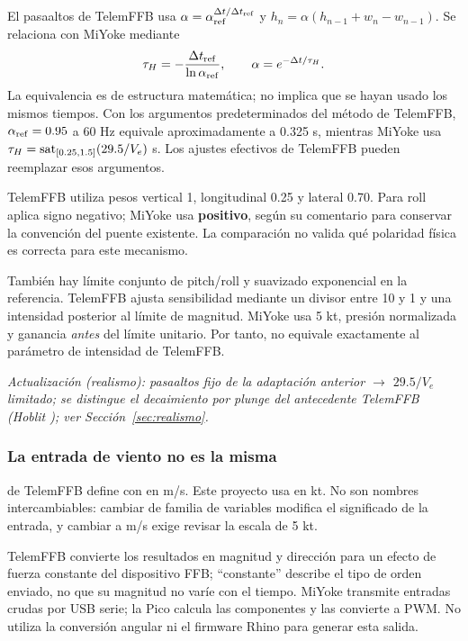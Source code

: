 El pasaaltos de TelemFFB usa $\alpha=\alpha_{\rm ref}^{\Delta t/\Delta t_{\rm ref}}$ y $h_n=\alpha(h_{n-1}+w_n-w_{n-1})$. Se relaciona con MiYoke mediante
\begin{equation}
\tau_H=-\frac{\Delta t_{\rm ref}}{\ln\alpha_{\rm ref}},
\qquad \alpha=e^{-\Delta t/\tau_H}.
\end{equation}
La equivalencia es de estructura matemática; no implica que se hayan usado los mismos tiempos. Con los argumentos predeterminados del método de TelemFFB, $\alpha_{\rm ref}=0.95$ a 60 Hz equivale aproximadamente a 0.325 s, mientras MiYoke usa $\tau_H=\operatorname{sat}_{[0.25,1.5]}(29.5/V_e)$ s. Los ajustes efectivos de TelemFFB pueden reemplazar esos argumentos.

TelemFFB utiliza pesos vertical 1, longitudinal 0.25 y lateral 0.70. Para roll aplica signo negativo; MiYoke usa \textbf{positivo}, según su comentario para conservar la convención del puente existente. La comparación no valida qué polaridad física es correcta para este mecanismo.

También hay límite conjunto de pitch/roll y suavizado exponencial en la referencia. TelemFFB ajusta sensibilidad mediante un divisor entre 10 y 1 y una intensidad posterior al límite de magnitud. MiYoke usa 5 kt, presión normalizada y ganancia \emph{antes} del límite unitario. Por tanto,  no equivale exactamente al parámetro de intensidad de TelemFFB.

\textit{Actualización (realismo): pasaaltos fijo de la adaptación anterior $\rightarrow$ $29.5/V_e$ limitado; se distingue el decaimiento por plunge del antecedente TelemFFB (Hoblit \cite{hoblit1988}); ver Sección~\ref{sec:realismo}.}

\subsubsection{La entrada de viento no es la misma}
 de TelemFFB define  con  en m/s. Este proyecto usa  en kt. No son nombres intercambiables: cambiar de familia de variables modifica el significado de la entrada, y cambiar a m/s exige revisar la escala de 5 kt.

TelemFFB convierte los resultados en magnitud y dirección para un efecto de fuerza constante del dispositivo FFB; ``constante'' describe el tipo de orden enviado, no que su magnitud no varíe con el tiempo. MiYoke transmite entradas crudas por USB serie; la Pico calcula las componentes y las convierte a PWM. No utiliza la conversión angular ni el firmware Rhino para generar esta salida.

